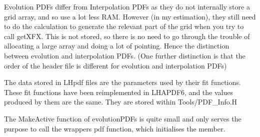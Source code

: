Evolution PDFs differ from Interpolation PDFs as they do not internally
store a grid array, and so use a lot less RAM. However (in my estimation),
they still need to do the calculation to generate the relevant part of the
grid when you try to call getXFX. This is not stored, so there is no need
to go through the trouble of allocating a large array and doing a lot of
pointing. Hence the distinction between evolution and interpolation PDFs.
(One further distinction is that the order of the header file is different
for evolution and interpolation PDFs)

The data stored in LHpdf files are the parameters used by their fit
functions. These fit functions have been reimplemented in LHAPDF6, and the
values produced by them are the same. They are stored within
Tools/PDF\_Info.H

The MakeActive function of evolutionPDFs is quite small and only serves the
purpose to call the wrappers pdf function, which initialises the member.
